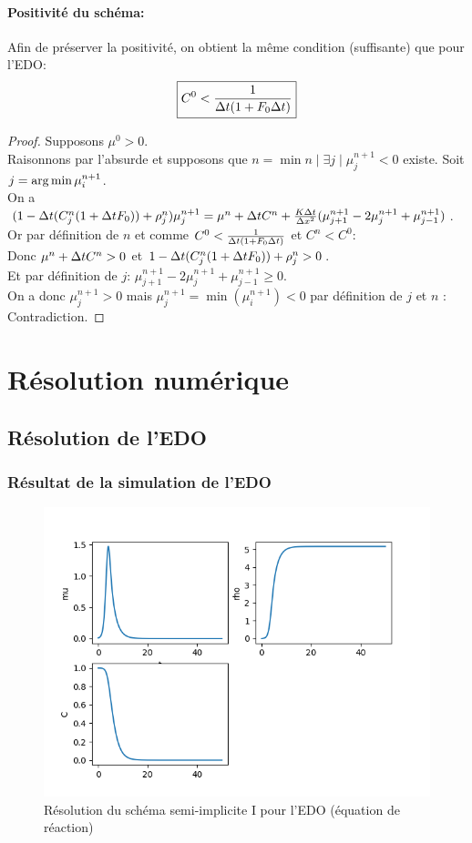 \documentclass[11pt]{article}
\begin{document}
\paragraph{Positivité du schéma:}
Afin de préserver la positivité, on obtient la même condition (suffisante) que pour l'EDO:
\begin{equation}
	\boxed{C^0< \frac{1}{\Delta t(1+F_0\Delta t)}}
\end{equation}
\begin{proof} Supposons $\mu^0 >0$.\\ Raisonnons par l'absurde et supposons que $n=\min{n \mid \exists j \mid \mu^{n+1}_j < 0}$ existe. Soit $j = \operatorname*{arg\,min}{\mu^{n+1}_i}$.\\
On a $(1-\Delta t(C^{n}_j(1+\Delta t F_0)) + \rho^{n}_j)\mu^{n+1}_j = \mu^{n}+  \Delta t C^{n} +\frac{K\Delta t}{\Delta x^2}(\mu^{n+1}_{j+1} - 2\mu^{n+1}_j + \mu^{n+1}_{j-1}) $. \\
Or par définition de $n$ et comme $C^0< \frac{1}{\Delta t(1+F_0\Delta t)}$ et $C^n < C^0$:\\
 Donc $ \mu^{n}+  \Delta t C^{n} > 0$ et
 $ 1-\Delta t(C^{n}_j(1+\Delta t F_0)) + \rho^{n}_j > 0$. \\
Et par définition de $j$: 
$\mu^{n+1}_{j+1} - 2\mu^{n+1}_j + \mu^{n+1}_{j-1} \geq 0$.\\
On a donc $\mu^{n+1}_j > 0$ mais   $\mu^{n+1}_j = \min(\mu^{n+1}_i) < 0$ par définition de $j$ et $n$ : Contradiction.
\end{proof}

\newpage
\section{Résolution numérique}
\subsection{Résolution de l'EDO}
\subsubsection{Résultat de la simulation de l'EDO}
\begin{figure}[hbt!]
\centering
\includegraphics[width=.9\textwidth]{Images/edo_euler_implicite.png}
\caption{Résolution du schéma semi-implicite I pour l'EDO (équation de réaction)}
\end{figure}
\end{document}
